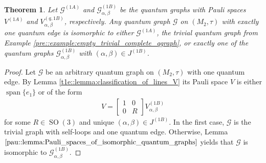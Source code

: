 \documentclass{amsart}
\newcommand{\comments}[1]{}
\newtheorem{thm}{Theorem}[section]
\DeclareMathOperator{\SO}{SO}
\DeclareMathOperator{\spann}{span}
\begin{document}
\comments{
\begin{thm}
    \label{dir::thm:all_directed_loopfree_qgraphs_with_one_edge_on_M_2}
    For every $(\alpha, \beta) \in J^{(1B)}$ let $\mathcal{G}_{\alpha, \beta}^{(1B)}$ be the quantum graph with Pauli space
    \begin{align*}
        V_{\alpha, \beta}^{(1B)} = \spann \left\{ \begin{pmatrix}
            \alpha \\ 1 \\i \beta \\ 0
        \end{pmatrix} \right\}.
    \end{align*}
    Any quantum graph $\mathcal{G}$ on $(M_2,\tau)$ with one quantum edge is isomorphic to either the trivial quantum graph $\mathcal{G}^{(1A)}$ (see Example \ref{pre::example:empty_trivial_complete_qgraph})  with self-loops \todo{Nina an Björn 05??: Wieso werden hier die self-loops hervorgehoben?} or exactly one of the quantum graphs $\mathcal{G}_{\alpha,\beta}^{(1B)}$ with $(\alpha,\beta)\in J^{(1B)}$.
\end{thm}
}

\begin{thm}
    \label{t1e::thm:classification_of_1te_qgraphs}
    Let $\mathcal{G}^{(1A)}$ and $\mathcal{G}_{\alpha, \beta}^{(1B)}$ be the quantum graphs with Pauli spaces $V^{(1A)}$ and $V_{\alpha, \beta}^{(q, 1B)}$, respectively.
    Any quantum graph $\mathcal{G}$ on $(M_2,\tau)$ with exactly one quantum edge is isomorphic to either $\mathcal{G}^{(1A)}$, the trivial quantum graph from Example \ref{pre::example:empty_trivial_complete_qgraph}, or exactly one of the quantum graphs $\mathcal{G}_{\alpha,\beta}^{(1B)}$ with $(\alpha,\beta)\in J^{(1B)}$.
\end{thm}

\begin{proof}
    Let $\mathcal{G}$ be an arbitrary quantum graph on $(M_2, \tau)$ with one quantum edge. By Lemma \ref{t1e::lemma:classification_of_lines_V} its Pauli space $V$ is either $\spann\{e_1\}$ or of the form
    \begin{align*}
        V = \left[\begin{array}{c|c}
            1& 0 \\
            \hline
            0 & R 
            \end{array}\right] 
            V_{\alpha, \beta}^{(1B)}
    \end{align*}
    for some $R \in \SO(3)$ and unique $(\alpha,\beta)\in J^{(1B)}$.
     In the first case, $\mathcal{G}$ is the trivial graph with self-loops and one quantum edge. Otherwise, Lemma $\ref{pau::lemma:Pauli_spaces_of_isomorphic_quantum_graphs}$ yields that $\mathcal{G}$ is isomorphic to $\mathcal{G}_{\alpha, \beta}^{(1B)}$. 
\end{proof}
\end{document}
